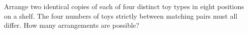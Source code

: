 Arrange two identical copies of each of four distinct toy types in eight positions on a shelf. The four numbers of toys strictly between matching pairs must all differ. How many arrangements are possible?
